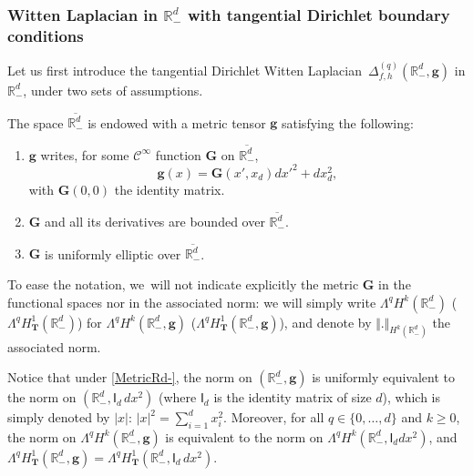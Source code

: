 \documentclass[JEP,XML,SOM,Unicode,NoEqCountersInSection,NoFloatCountersInSection,published]{cedram}
\newenvironment{enumeratei}
{\bgroup\def\theenumi{\roman{enumi}}\def\theenumii{\arabic{enumii}}\begin{enumerate}}
{\end{enumerate}\egroup}
\newcommand{\mbf}[1]{\mathbf{#1}}
\theoremstyle{plain}
\theoremstyle{definition}
\newenvironment{manualassumption}[1]{%
\renewcommand\themanualassumptioninner{#1}%
\manualassumptioninner}{\endmanualassumptioninner}
\begin{document}
\subsubsection{Witten Laplacian in $\mathbb R^d_-$ with tangential
Dirichlet boundary conditions}\label{sec.Rdmoins_main}
Let us first introduce the tangential
Dirichlet Witten
Laplacian~$\Delta_{f,h}^{(q)} (\mathbb R^d_-,\mbf g)$ in $ \mathbb
R^d_-$, under two sets of assumptions.

\begin{manualassumption}{$(\textup{Metric-}\mathbb R^{d}_-)$}\label{MetricRd-}
The space $\overline{\mathbb R^d_-}$ is endowed with a metric
tensor $\mbf g$ satisfying the following:
\begin{enumeratei}
\item\label{MetricRd-i}
$\mbf g$ writes, for some $\mathcal C^\infty$ function
$\mbf G$ on $\overline{\mathbb R^d_-}$,
\begin{equation}\label{eq.outc2}
\mbf g(x) = {\mbf G}(x',x_d)dx'^2+dx_d^2,
\end{equation}
with ${\mbf G}(0,0)$ the identity matrix.
\item\label{MetricRd-ii}
${\mbf G}$ and all its derivatives are bounded over $\overline{\mathbb R^d_-}$.
\item\label{MetricRd-iii}
${\mbf G}$ is uniformly elliptic over $\overline{\mathbb R^d_-}$.
\end{enumeratei}
\end{manualassumption}

To ease the notation, we~will not indicate explicitly the metric ${\mbf G}$ in the
functional spaces nor in the associated norm: we will simply write $ \Lambda^qH^k(\mathbb
R^{d}_-)$ (\resp $\Lambda^qH^1_{\mbf T}(\mathbb R^d_-)$) for
$\Lambda^qH^k(\mathbb R^{d}_-,\mbf g)$ (\resp $\Lambda^qH^1_{\mbf
T}(\mathbb R^d_-,\mbf g)$), and denote by $ \Vert. \Vert_{H^k(\mathbb R^{d}_-)}$ the associated norm.

Notice that under \ref{MetricRd-}, the norm on $(\mathbb R^d_-,
\mbf g)$ is uniformly equivalent to the norm on $(\mathbb R^d_-,
\mathsf I_{d} \, dx^2)$ (where
$\mathsf I_{d}$ is the identity matrix of size $d$), which is simply denoted by $\vert x \vert$: $\vert x\vert^2=\sum_{i=1}^{d}x_i^2$.
Moreover, for all $q\in \{0,\ldots,d\}$ and $k\ge 0$, the norm on $\Lambda^qH^k(\mathbb R^d_-,\mbf g)$ is equivalent to the norm on $\Lambda^qH^k(\mathbb R^d_-, \mathsf I_d dx^2)$, and
$\Lambda^qH^1_{\mbf T}(\mathbb R^d_-,\mbf g)=\Lambda^qH^1_{\mbf T}(\mathbb R^d_-, \mathsf I_{d} \, dx^2)$.
\end{document}
